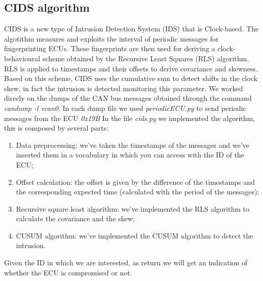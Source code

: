 \documentclass[12pt]{article}
\begin{document}
\subsection{CIDS algorithm}
CIDS is a new type of Intrusion Detection System (IDS) that is Clock-based. The algotithm measures and 
exploits the interval of periodic messages for fingerprinting ECUs. These fingerprints are then used for 
deriving a clock-behavioural scheme obtained by the Recursive Least Squares (RLS) algorithm. RLS is 
applied to timestamps and their offsets to derive covariance and skewness. Based on this scheme, 
CIDS uses the cumulative sum to detect shifts in the clock skew, in fact the intrusion is detected 
monitoring this parameter. We worked direcly on the dumps of the CAN bus messages obtained through 
the command \textit{candump -l vcan0}. In each dump file we used \textit{periodicECU.py} to send periodic 
messages from the ECU \textit{0x19B}
In the file \textit{cids.py} we implemented the algorithm, this is composed by several 
parts:
\begin{enumerate}
    \item Data preprocessing: we've taken the timestamps of the messages and we've inserted them 
    in a vocabulary in which you can access with the ID of the ECU;
    \item Offset calculation: the offset is given by the difference of the timestamps and the corresponding
    expected time (calculated with the period of the messages);
    \item Recursive square least algorithm: we've implemented the RLS algorithm to calculate the covariance 
    and the skew;
    \item CUSUM algorithm: we've implemented the CUSUM algorithm to detect the intrusion. 
\end{enumerate}
Given the ID in which we are interested, as return we will get an indication of whether the ECU is
compromised or not.
\end{document}
